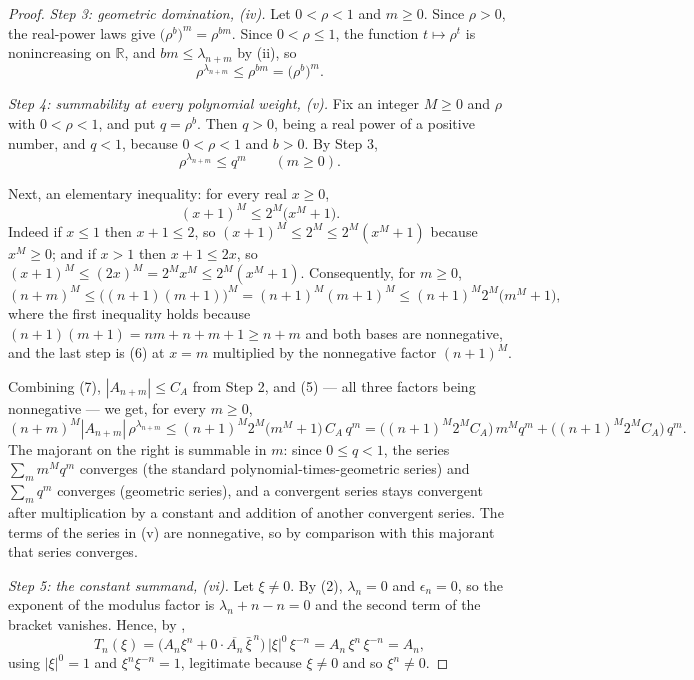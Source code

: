 \begin{proof}
\emph{Step 3: geometric domination, (iv).}  Let $0<\rho<1$ and $m\ge0$.  Since
$\rho>0$, the real-power laws give
$\bigl(\rho^{b}\bigr)^{m}=\rho^{bm}$.  Since $0<\rho\le1$, the function
$t\mapsto\rho^{t}$ is nonincreasing on $\mathbb{R}$, and $bm\le\lambda_{n+m}$
by (ii), so
\[
  \rho^{\lambda_{n+m}}\le\rho^{bm}=\bigl(\rho^{b}\bigr)^{m} .
\]

\emph{Step 4: summability at every polynomial weight, (v).}  Fix an integer
$M\ge0$ and $\rho$ with $0<\rho<1$, and put $q=\rho^{b}$.  Then $q>0$, being a
real power of a positive number, and $q<1$, because $0<\rho<1$ and $b>0$.  By
Step 3,
\begin{equation}\tag{5}
  \rho^{\lambda_{n+m}}\le q^{m}\qquad(m\ge0).
\end{equation}

Next, an elementary inequality: for every real $x\ge0$,
\begin{equation}\tag{6}
  (x+1)^{M}\le2^{M}\bigl(x^{M}+1\bigr).
\end{equation}
Indeed if $x\le1$ then $x+1\le2$, so $(x+1)^{M}\le2^{M}\le2^{M}(x^{M}+1)$
because $x^{M}\ge0$; and if $x>1$ then $x+1\le2x$, so
$(x+1)^{M}\le(2x)^{M}=2^{M}x^{M}\le2^{M}(x^{M}+1)$.  Consequently, for $m\ge0$,
\begin{equation}\tag{7}
  (n+m)^{M}\le\bigl((n+1)(m+1)\bigr)^{M}=(n+1)^{M}(m+1)^{M}
  \le(n+1)^{M}2^{M}\bigl(m^{M}+1\bigr),
\end{equation}
where the first inequality holds because
$(n+1)(m+1)=nm+n+m+1\ge n+m$ and both bases are nonnegative, and the last
step is (6) at $x=m$ multiplied by the nonnegative factor $(n+1)^{M}$.

Combining (7), $|A_{n+m}|\le C_A$ from Step 2, and (5) --- all three factors
being nonnegative --- we get, for every $m\ge0$,
\[
  (n+m)^{M}|A_{n+m}|\,\rho^{\lambda_{n+m}}
  \le(n+1)^{M}2^{M}\bigl(m^{M}+1\bigr)\,C_A\,q^{m}
  =\bigl((n+1)^{M}2^{M}C_A\bigr)\,m^{M}q^{m}
   +\bigl((n+1)^{M}2^{M}C_A\bigr)\,q^{m} .
\]
The majorant on the right is summable in $m$: since $0\le q<1$, the series
$\sum_m m^{M}q^{m}$ converges (the standard polynomial-times-geometric
series) and $\sum_m q^{m}$ converges (geometric series), and a convergent
series stays convergent after multiplication by a constant and addition of
another convergent series.  The terms of the series in (v) are nonnegative,
so by comparison with this majorant that series converges.

\emph{Step 5: the constant summand, (vi).}  Let $\xi\ne0$.  By (2),
$\lambda_n=0$ and $\epsilon_n=0$, so the exponent of the modulus factor is
$\lambda_n+n-n=0$ and the second term of the bracket vanishes.  Hence, by
,
\[
  T_n(\xi)=\bigl(A_n\xi^{n}+0\cdot\overline{A_n}\,\bar\xi^{\,n}\bigr)
    \,|\xi|^{0}\,\xi^{-n}
  =A_n\,\xi^{n}\,\xi^{-n}=A_n ,
\]
using $|\xi|^{0}=1$ and $\xi^{n}\xi^{-n}=1$, legitimate because $\xi\ne0$ and
so $\xi^{n}\ne0$.


\end{proof}
